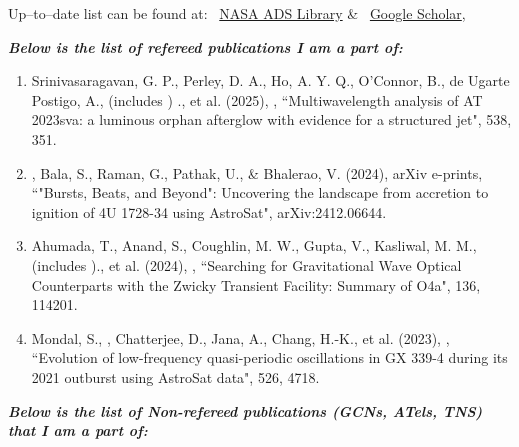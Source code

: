 \small
Up--to--date list can be found at: 
\faGlobe~\href{https://ui.adsabs.harvard.edu/search/q=orcid%3A0000-0003-3173-4691&sort=date+desc}{NASA ADS Library} \& \faIcon{google}~\href{https://scholar.google.com/citations?user=BdMzZJ4AAAAJ}{Google Scholar}, 
\\
\vspace{0.5em}
\normalsize

\textit{\textbf{Below is the list of refereed publications I am a part of:}}
\begin{enumerate}
\item Srinivasaragavan, G. P., Perley, D. A., Ho, A. Y. Q., O'Connor, B., de Ugarte Postigo, A.,  (includes \me) ., et al. (2025), \mnras, {``Multiwavelength analysis of AT 2023sva: a luminous orphan afterglow with evidence for a structured jet"}, 538, 351.

\item \me, Bala, S., Raman, G., Pathak, U., \& Bhalerao, V. (2024), arXiv e-prints, {``"Bursts, Beats, and Beyond": Uncovering the landscape from accretion to ignition of 4U 1728-34 using AstroSat"}, arXiv:2412.06644.

\item Ahumada, T., Anand, S., Coughlin, M. W., Gupta, V., Kasliwal, M. M., (includes \me)., et al. (2024), \pasp, {``Searching for Gravitational Wave Optical Counterparts with the Zwicky Transient Facility: Summary of O4a"}, 136, 114201.

\item Mondal, S., \me, Chatterjee, D., Jana, A., Chang, H.-K., et al. (2023), \mnras, {``Evolution of low-frequency quasi-periodic oscillations in GX 339-4 during its 2021 outburst using AstroSat data"}, 526, 4718.

\end{enumerate}

\textit{\textbf{Below is the list of Non-refereed publications (GCNs, ATels, TNS) that I am a part of:}}

